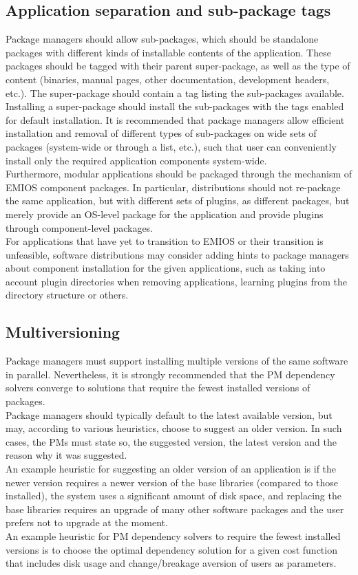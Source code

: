 \documentclass[a4paper,utf8,11pt]{article}
\begin{document}
	\subsection{Application separation and sub-package tags}
	Package managers should allow sub-packages, which should be standalone packages with different kinds of installable contents of the application. These packages should be tagged with their parent super-package, as well as the type of content (binaries, manual pages, other documentation, development headers, etc.). The super-package should contain a tag listing the sub-packages available. Installing a super-package should install the sub-packages with the tags enabled for default installation. It is recommended that package managers allow efficient installation and removal of different types of sub-packages on wide sets of packages (system-wide or through a list, etc.), such that user can conveniently install only the required application components system-wide.\\
	Furthermore, modular applications should be packaged through the mechanism of EMIOS component packages. In particular, distributions should not re-package the same application, but with different sets of plugins, as different packages, but merely provide an OS-level package for the application and provide plugins through component-level packages.\\
	For applications that have yet to transition to EMIOS or their transition is unfeasible, software distributions may consider adding hints to package managers about component installation for the given applications, such as taking into account plugin directories when removing applications, learning plugins from the directory structure or others.
	\subsection{Multiversioning}
	Package managers must support installing multiple versions of the same software in parallel. Nevertheless, it is strongly recommended that the PM dependency solvers converge to solutions that require the fewest installed versions of packages.\\
	Package managers should typically default to the latest available version, but may, according to various heuristics, choose to suggest an older version. In such cases, the PMs must state so, the suggested version, the latest version and the reason why it was suggested.\\
	An example heuristic for suggesting an older version of an application is if the newer version requires a newer version of the base libraries (compared to those installed), the system uses a significant amount of disk space, and replacing the base libraries requires an upgrade of many other software packages and the user prefers not to upgrade at the moment.\\
	An example heuristic for PM dependency solvers to require the fewest installed versions is to choose the optimal dependency solution for a given cost function that includes disk usage and change/breakage aversion of users as parameters.
\end{document}
